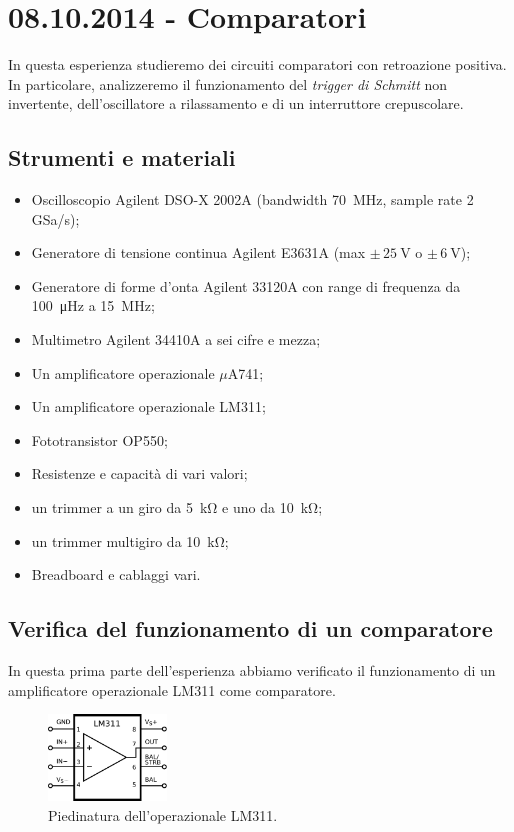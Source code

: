 \section{08.10.2014 - Comparatori}

In questa esperienza studieremo dei circuiti comparatori con retroazione positiva. In particolare, analizzeremo il funzionamento del \textit{trigger di Schmitt} non invertente, dell'oscillatore a rilassamento e di un interruttore crepuscolare.

\subsection*{Strumenti e materiali}

\begin{itemize} [noitemsep]
\item Oscilloscopio Agilent DSO-X 2002A (bandwidth \SI{70}{\mega\hertz}, sample rate \num{2} GSa/s);
\item Generatore di tensione continua Agilent E3631A (max $\pm \, \SI{25}{\volt}$ o $\pm \, \SI{6}{\volt}$);
\item Generatore di forme d'onta Agilent 33120A con range di frequenza da \SI{100}{\micro\hertz} a \SI{15}{\mega\hertz};
\item Multimetro Agilent 34410A a sei cifre e mezza;
\item Un amplificatore operazionale $\mu$A741;
\item Un amplificatore operazionale LM311;
\item Fototransistor OP550;
\item Resistenze e capacità di vari valori;
\item un trimmer a un giro da \SI{5}{\kilo\ohm} e uno da \SI{10}{\kilo\ohm};
\item un trimmer multigiro da \SI{10}{\kilo\ohm};
\item Breadboard e cablaggi vari.
\end{itemize}

\subsection{Verifica del funzionamento di un comparatore}

In questa prima parte dell'esperienza abbiamo verificato il funzionamento di un amplificatore operazionale LM311 come comparatore.

\begin{figure}
  \begin{center}
    \includegraphics[width=0.280\textwidth]{../E04/latex/LM311.pdf}
  \end{center}
  \caption{Piedinatura dell'operazionale LM311.}
  \label{cir4:piedinatura_LM311}
\end{figure}


